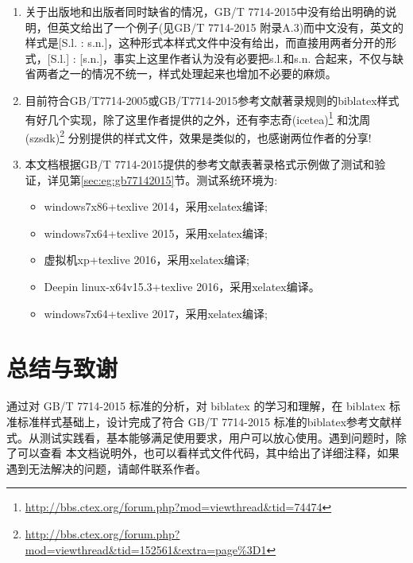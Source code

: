 \begin{enumerate}
  \item 关于出版地和出版者同时缺省的情况，GB/T 7714-2015中没有给出明确的说明，但英文给出了一个例子(见GB/T 7714-2015 附录A.3)而中文没有，英文的样式是[S.l. : s.n.]，这种形式本样式文件中没有给出，而直接用两者分开的形式，[S.l.] : [s.n.]，事实上这里作者认为没有必要把s.l.和s.n. 合起来，不仅与缺省两者之一的情况不统一，样式处理起来也增加不必要的麻烦。

  \item 目前符合GB/T7714-2005或GB/T7714-2015参考文献著录规则的biblatex样式有好几个实现，除了这里作者提供的之外，还有李志奇(icetea)\footnote{\url{http://bbs.ctex.org/forum.php?mod=viewthread&tid=74474}} 和沈周(szsdk)\footnote{\url{http://bbs.ctex.org/forum.php?mod=viewthread&tid=152561&extra=page\%3D1}} 分别提供的样式文件，效果是类似的，也感谢两位作者的分享!

  \item 本文档根据GB/T 7714-2015提供的参考文献表著录格式示例做了测试和验证，详见第\ref{sec:eg:gb77142015}节。测试系统环境为:
    \begin{itemize}
    \item windows7x86+texlive 2014，采用xelatex编译;

    \item windows7x64+texlive 2015，采用xelatex编译;

    \item 虚拟机xp+texlive 2016，采用xelatex编译;

    \item Deepin linux-x64v15.3+texlive 2016，采用xelatex编译。

    \item windows7x64+texlive 2017，采用xelatex编译;
    \end{itemize}

\end{enumerate}


\section{总结与致谢}

通过对 GB/T 7714-2015 标准的分析，对 biblatex 的学习和理解，在 biblatex 标准标准样式基础上，设计完成了符合 GB/T 7714-2015 标准的biblatex参考文献样式。从测试实践看，基本能够满足使用要求，用户可以放心使用。遇到问题时，除了可以查看
本文档说明外，也可以看样式文件代码，其中给出了详细注释，如果遇到无法解决的问题，请邮件联系作者。


